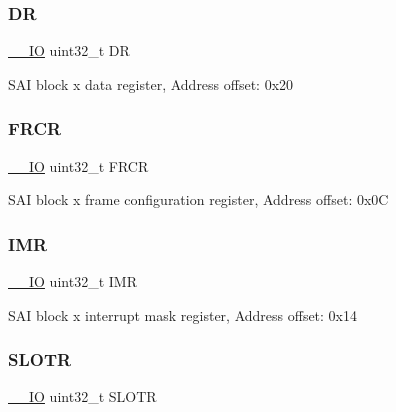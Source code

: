 \subsubsection{\texorpdfstring{DR}{DR}}
{\footnotesize\ttfamily \mbox{\hyperlink{core__sc300_8h_aec43007d9998a0a0e01faede4133d6be}{\+\_\+\+\_\+\+IO}} uint32\+\_\+t DR}

S\+AI block x data register, Address offset\+: 0x20 \mbox{\label{struct_s_a_i___block___type_def_ae307d5a553582e6c9717f50037245710}} 
\subsubsection{\texorpdfstring{F\+R\+CR}{FRCR}}
{\footnotesize\ttfamily \mbox{\hyperlink{core__sc300_8h_aec43007d9998a0a0e01faede4133d6be}{\+\_\+\+\_\+\+IO}} uint32\+\_\+t F\+R\+CR}

S\+AI block x frame configuration register, Address offset\+: 0x0C \mbox{\label{struct_s_a_i___block___type_def_ae845b86e973b4bf8a33c447c261633f6}} 
\subsubsection{\texorpdfstring{I\+MR}{IMR}}
{\footnotesize\ttfamily \mbox{\hyperlink{core__sc300_8h_aec43007d9998a0a0e01faede4133d6be}{\+\_\+\+\_\+\+IO}} uint32\+\_\+t I\+MR}

S\+AI block x interrupt mask register, Address offset\+: 0x14 \mbox{\label{struct_s_a_i___block___type_def_ad30f20f612dacf85a5bb7f9f97cf0772}} 
\subsubsection{\texorpdfstring{S\+L\+O\+TR}{SLOTR}}
{\footnotesize\ttfamily \mbox{\hyperlink{core__sc300_8h_aec43007d9998a0a0e01faede4133d6be}{\+\_\+\+\_\+\+IO}} uint32\+\_\+t S\+L\+O\+TR}

